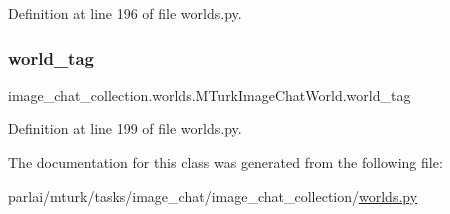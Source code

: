 Definition at line 196 of file worlds.\+py.

\mbox{\label{classimage__chat__collection_1_1worlds_1_1MTurkImageChatWorld_a0be08870bfc570382e035bc0b6119b62}} 
\subsubsection{\texorpdfstring{world\+\_\+tag}{world\_tag}}
{\footnotesize\ttfamily image\+\_\+chat\+\_\+collection.\+worlds.\+M\+Turk\+Image\+Chat\+World.\+world\+\_\+tag}



Definition at line 199 of file worlds.\+py.



The documentation for this class was generated from the following file\+:\begin{DoxyCompactItemize}
\item 
parlai/mturk/tasks/image\+\_\+chat/image\+\_\+chat\+\_\+collection/\hyperlink{parlai_2mturk_2tasks_2image__chat_2image__chat__collection_2worlds_8py}{worlds.\+py}\end{DoxyCompactItemize}
